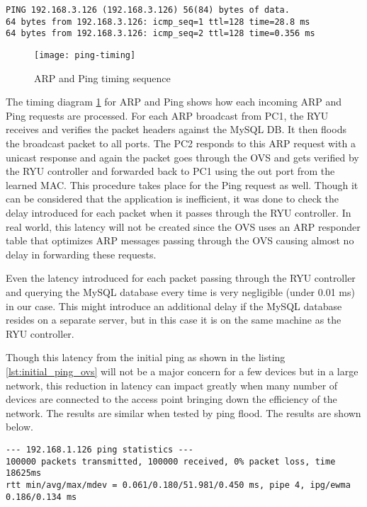 \begin{lstlisting}[caption={Initial Ping result with OVS},label={lst:initial_ping_ovs}]
PING 192.168.3.126 (192.168.3.126) 56(84) bytes of data.
64 bytes from 192.168.3.126: icmp_seq=1 ttl=128 time=28.8 ms
64 bytes from 192.168.3.126: icmp_seq=2 ttl=128 time=0.356 ms
\end{lstlisting}

\begin{figure}
	\centering
	\texttt{[image: ping-timing]}
	\caption {ARP and Ping timing sequence}
	\label{fig:arp_ping_timing}
	\vspace{-10pt}
\end{figure}

The timing diagram \ref{fig:arp_ping_timing} for ARP and Ping shows how each incoming ARP and Ping requests are processed. For each ARP broadcast from PC1, the RYU receives and verifies the packet headers against the MySQL DB. It then floods the broadcast packet to all ports. The PC2 responds to this ARP request with a unicast response and again the packet goes through the OVS and gets verified by the RYU controller and forwarded back to PC1 using the out port from the learned MAC. This procedure takes place for the Ping request as well. Though it can be considered that the application is inefficient, it was done to check the delay introduced for each packet when it passes through the RYU controller. In real world, this latency will not be created since the OVS uses an ARP responder table \cite{man_ofctl} that optimizes ARP messages passing through the OVS causing almost no delay in forwarding these requests. 

Even the latency introduced for each packet passing through the RYU controller and querying the MySQL database every time is very negligible (under 0.01 ms) in our case. This might introduce an additional delay if the MySQL database resides on a separate server, but in this case it is on the same machine as the RYU controller. 


Though this latency from the initial ping as shown in the listing \ref{lst:initial_ping_ovs} will not be a major concern for a few devices but in a large network, this reduction in latency can impact greatly when many number of devices are connected to the access point bringing down the efficiency of the network. The results are similar when tested by ping flood. The results are shown below.

\begin{lstlisting}[caption={Ping Flood Without OVS}, label={pingflood_no_ovs}]
--- 192.168.1.126 ping statistics ---
100000 packets transmitted, 100000 received, 0% packet loss, time 18625ms
rtt min/avg/max/mdev = 0.061/0.180/51.981/0.450 ms, pipe 4, ipg/ewma 0.186/0.134 ms
\end{lstlisting}

